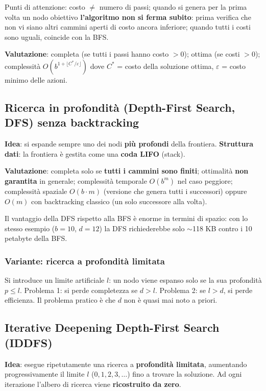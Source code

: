 \documentclass[11pt,a4paper]{report}
\begin{document}
Punti di attenzione: costo $\neq$ numero di passi; quando si genera per la prima volta un nodo obiettivo \textbf{l'algoritmo non si ferma subito}: prima verifica che non vi siano altri cammini aperti di costo ancora inferiore; quando tutti i costi sono uguali, coincide con la BFS.

\textbf{Valutazione}: completa (se tutti i passi hanno costo $>0$); ottima (se costi $>0$); complessità $O(b^{1+\lfloor C^*/\varepsilon \rfloor})$ dove $C^*$ = costo della soluzione ottima, $\varepsilon$ = costo minimo delle azioni.

\subsection{Ricerca in profondità (Depth-First Search, DFS) senza backtracking}

\textbf{Idea}: si espande sempre uno dei nodi \textbf{più profondi} della frontiera. \textbf{Struttura dati}: la frontiera è gestita come una \textbf{coda LIFO} (stack).

\textbf{Valutazione}: completa solo se \textbf{tutti i cammini sono finiti}; ottimalità \textbf{non garantita} in generale; complessità temporale $O(b^m)$ nel caso peggiore; complessità spaziale $O(b\cdot m)$ (versione che genera tutti i successori) oppure $O(m)$ con backtracking classico (un solo successore alla volta).

Il vantaggio della DFS rispetto alla BFS è enorme in termini di spazio: con lo stesso esempio ($b=10$, $d=12$) la DFS richiederebbe solo $\sim$118 KB contro i 10 petabyte della BFS.

\subsubsection*{Variante: ricerca a profondità limitata}

Si introduce un limite artificiale $l$: un nodo viene espanso solo se la sua profondità $p \le l$. Problema 1: si perde completezza se $d > l$. Problema 2: se $l > d$, si perde efficienza. Il problema pratico è che $d$ non è quasi mai noto a priori.

\subsection{Iterative Deepening Depth-First Search (IDDFS)}

\textbf{Idea}: esegue ripetutamente una ricerca a \textbf{profondità limitata}, aumentando progressivamente il limite $l$ ($0,1,2,3,\dots$) fino a trovare la soluzione. Ad ogni iterazione l'albero di ricerca viene \textbf{ricostruito da zero}.
\end{document}
